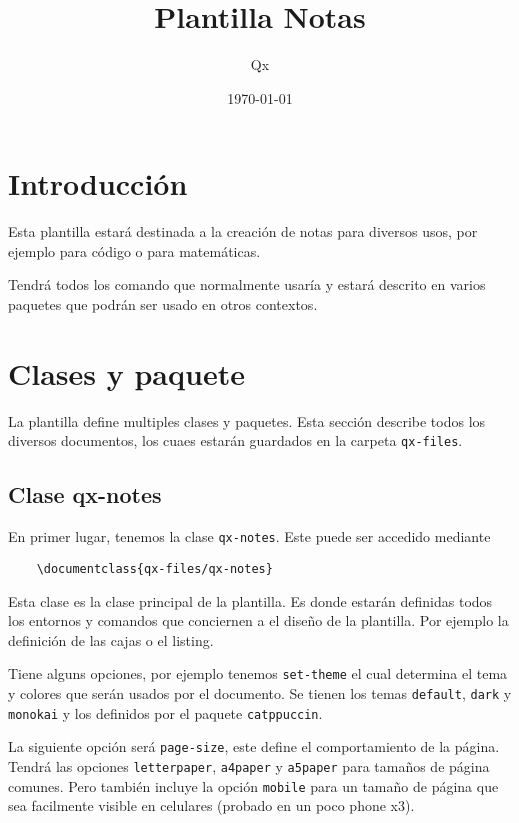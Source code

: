 \documentclass[theme=mocha, pagecolor=true, pagesize=a5paper]{qx-files/qx-notes}
\title{Plantilla Notas}
\author{Qx}
\date{\today}
\begin{document}
  \maketitle



  \section{Introducción}

  Esta plantilla estará destinada a la creación de notas para diversos usos, por ejemplo para código o para matemáticas.

  Tendrá todos los comando que normalmente usaría y estará descrito en varios paquetes que podrán ser usado en otros contextos.



  \section{Clases y paquete}

  La plantilla define multiples clases y paquetes. Esta sección describe todos los diversos documentos, los cuaes estarán guardados en la carpeta \verb|qx-files|.



  \subsection{Clase qx-notes}

  En primer lugar, tenemos la clase \verb|qx-notes|. Este puede ser accedido mediante
  \begin{verbatim}
    \documentclass{qx-files/qx-notes}
  \end{verbatim}

  Esta clase es la clase principal de la plantilla. Es donde estarán definidas todos los entornos y comandos que conciernen a el diseño de la plantilla. Por ejemplo la definición de las cajas o el listing.

  Tiene alguns opciones, por ejemplo tenemos \verb|set-theme| el cual determina el tema y colores que serán usados por el documento. Se tienen los temas \verb|default|, \verb|dark| y \verb|monokai| y los definidos por el paquete \verb|catppuccin|.

  La siguiente opción será \verb|page-size|, este define el comportamiento de la página. Tendrá las opciones \verb|letterpaper|, \verb|a4paper| y \verb|a5paper| para tamaños de página comunes. Pero también incluye la opción \verb|mobile| para un tamaño de página que sea facilmente visible en celulares (probado en un poco phone x3).
\end{document}

